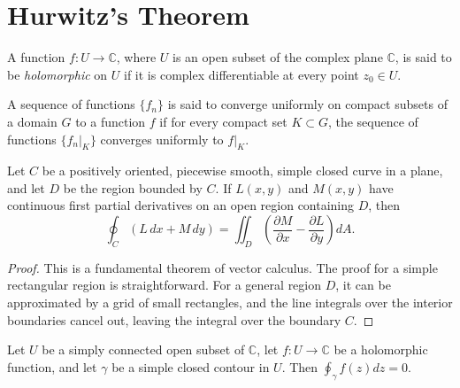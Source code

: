 \chapter{Hurwitz's Theorem}

\begin{definition}
    \label{def:Holomorphic_Function}
    A function $f: U \to \mathbb{C}$, where $U$ is an open subset of the complex plane $\mathbb{C}$, is said to be \textit{holomorphic} on $U$ if it is complex differentiable at every point $z_0 \in U$.
\end{definition}

\begin{definition}
    \label{def:Uniform_Convergence_on_Compact_Subsets}
    A sequence of functions $\{f_n\}$ is said to converge uniformly on compact subsets of a domain $G$ to a function $f$ if for every compact set $K \subset G$, the sequence of functions $\{f_n|_K\}$ converges uniformly to $f|_K$.
\end{definition}

\begin{lemma}
    \label{lem:Greens_Theorem}
    Let $C$ be a positively oriented, piecewise smooth, simple closed curve in a plane, and let $D$ be the region bounded by $C$. If $L(x,y)$ and $M(x,y)$ have continuous first partial derivatives on an open region containing $D$, then
    $$ \oint_C (L \, dx + M \, dy) = \iint_D \left(\frac{\partial M}{\partial x} - \frac{\partial L}{\partial y}\right) dA. $$
\end{lemma}

\begin{proof}
    This is a fundamental theorem of vector calculus. The proof for a simple rectangular region is straightforward. For a general region $D$, it can be approximated by a grid of small rectangles, and the line integrals over the interior boundaries cancel out, leaving the integral over the boundary $C$.
\end{proof}

\begin{lemma}
    \label{lem:Cauchy_Integral_Theorem}
    Let $U$ be a simply connected open subset of $\mathbb{C}$, let $f: U \to \mathbb{C}$ be a holomorphic function, and let $\gamma$ be a simple closed contour in $U$. Then $\oint_\gamma f(z) dz = 0$.
\end{lemma}

